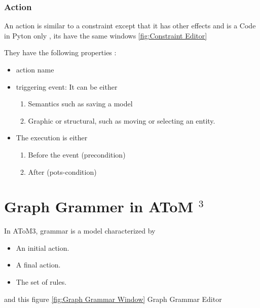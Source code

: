 \subsubsection{ Action }

An action is similar to a constraint except that it has other effects and is a
Code in Pyton only , its have the same windows \ref{fig:Constraint Editor} 

They have the following properties :
\begin{itemize}
\item action name
\item triggering event: It can be either
	\begin{enumerate}
	\item Semantics such as saving a model
	\item Graphic or structural, such as moving or selecting an entity.
	\end{enumerate}
	
\item The execution is either
	\begin{enumerate}
	\item Before the event (precondition)
	\item  After (pots-condition) 
	\end{enumerate}

\end{itemize}
 


\section{ Graph Grammer in AToM $^{3}$ }
In AToM3, grammar is a model characterized by
\begin{itemize}
\item An initial action.
\item A final action.
\item The set of rules. 
\end{itemize}
and this figure \ref{fig:Graph Grammar Window} Graph Grammar Editor
 
